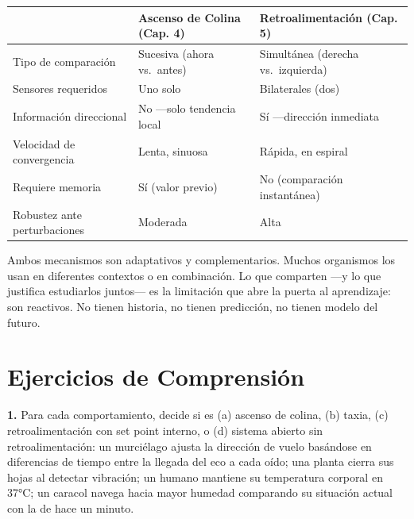 \documentclass[
  letterpaper,
  DIV=11,
  numbers=noendperiod]{scrreprt}
\begin{document}
\begin{tcolorbox}[enhanced jigsaw, toprule=.15mm, arc=.35mm, colback=white, opacityback=0, colframe=quarto-callout-note-color-frame, breakable, rightrule=.15mm, left=2mm, leftrule=.75mm, bottomrule=.15mm]
\begin{longtable}[]{@{}
  >{\raggedright\arraybackslash}p{}
  >{\raggedright\arraybackslash}p{}
  >{\raggedright\arraybackslash}p{}@{}}
\toprule\noalign{}
\begin{minipage}[b]{\linewidth}\raggedright
\end{minipage} & \begin{minipage}[b]{\linewidth}\raggedright
Ascenso de Colina (Cap. 4)
\end{minipage} & \begin{minipage}[b]{\linewidth}\raggedright
Retroalimentación (Cap. 5)
\end{minipage} \\
\midrule\noalign{}
\endhead
\bottomrule\noalign{}
\endlastfoot
Tipo de comparación & Sucesiva (ahora vs.~antes) & Simultánea (derecha
vs.~izquierda) \\
Sensores requeridos & Uno solo & Bilaterales (dos) \\
Información direccional & No ---solo tendencia local & Sí ---dirección
inmediata \\
Velocidad de convergencia & Lenta, sinuosa & Rápida, en espiral \\
Requiere memoria & Sí (valor previo) & No (comparación instantánea) \\
Robustez ante perturbaciones & Moderada & Alta \\
\end{longtable}

Ambos mecanismos son adaptativos y complementarios. Muchos organismos
los usan en diferentes contextos o en combinación. Lo que comparten ---y
lo que justifica estudiarlos juntos--- es la limitación que abre la
puerta al aprendizaje: son reactivos. No tienen historia, no tienen
predicción, no tienen modelo del futuro.

\section{Ejercicios de
Comprensión}\label{ejercicios-de-comprensiuxf3n-2}

\textbf{1.} Para cada comportamiento, decide si es (a) ascenso de
colina, (b) taxia, (c) retroalimentación con set point interno, o (d)
sistema abierto sin retroalimentación: un murciélago ajusta la dirección
de vuelo basándose en diferencias de tiempo entre la llegada del eco a
cada oído; una planta cierra sus hojas al detectar vibración; un humano
mantiene su temperatura corporal en 37°C; un caracol navega hacia mayor
humedad comparando su situación actual con la de hace un minuto.


\end{tcolorbox}
\end{document}
